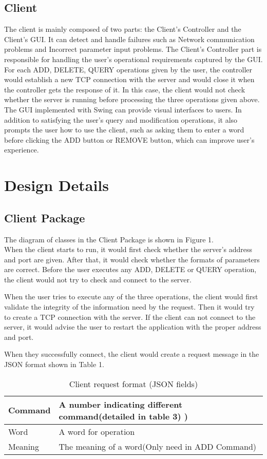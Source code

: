 \documentclass[a4paper]{article}
\begin{document}
\subsection{Client}
The client is mainly composed of two parts: the Client’s Controller and the Client’s GUI. It can detect and handle failures such as Network communication problems and Incorrect parameter input problems. The Client’s Controller part is responsible for handling the user’s operational requirements captured by the GUI. For each ADD, DELETE, QUERY operations given by the user, the controller would establish a new TCP connection with the server and would close it when the controller gets the response of it. In this case, the client would not check whether the server is running before processing the three operations given above. The GUI implemented with Swing can provide visual interfaces to users. In addition to satisfying the user’s query and modification operations, it also prompts the user how to use the client, such as asking them to enter a word before clicking the ADD button or REMOVE button, which can improve user’s experience.

\section{Design Details}
\subsection{Client Package}
The diagram of classes in the Client Package is shown in Figure 1.\\

When the client starts to run, it would first check whether the server's address and port are given. After that, it would check whether the formats of parameters are correct. Before the user executes any ADD, DELETE or QUERY operation, the client would not try to check and connect to the server.\par
When the user tries to execute any of the three operations, the client would first validate the integrity of the information need by the request. Then it would try to create a TCP connection with the server. If the client can not connect to the server, it would advise the user to restart the application with the proper address and port. \par
When they successfully connect, the client would create a request message in the JSON format shown in Table 1.

\begin{table}[H]
	\caption{Client request format (JSON fields)} 
	\begin{tabular}{|l|l|}
		\hline
		Command & A number indicating different command(detailed in table 3)   )                             \\ \hline
		Word & A word for operation                               \\ \hline
		Meaning  & The meaning of a word(Only need in ADD Command)\\ \hline
	\end{tabular}
\end{table}
\end{document}
